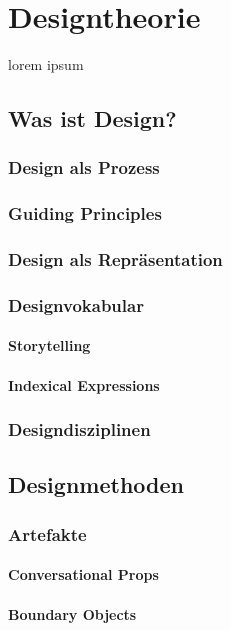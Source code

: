 \chapter{Designtheorie}\label{ch:designTheorie}

lorem ipsum

\section{Was ist Design?}
\subsection{Design als Prozess}
\subsection{Guiding Principles}
\subsection{Design als Repräsentation}
\subsection{Designvokabular}
\subsubsection{Storytelling}
\subsubsection{Indexical Expressions}
\subsection{Designdisziplinen}

\section{Designmethoden}
\subsection{Artefakte}
\subsubsection{Conversational Props}
\subsubsection{Boundary Objects}
